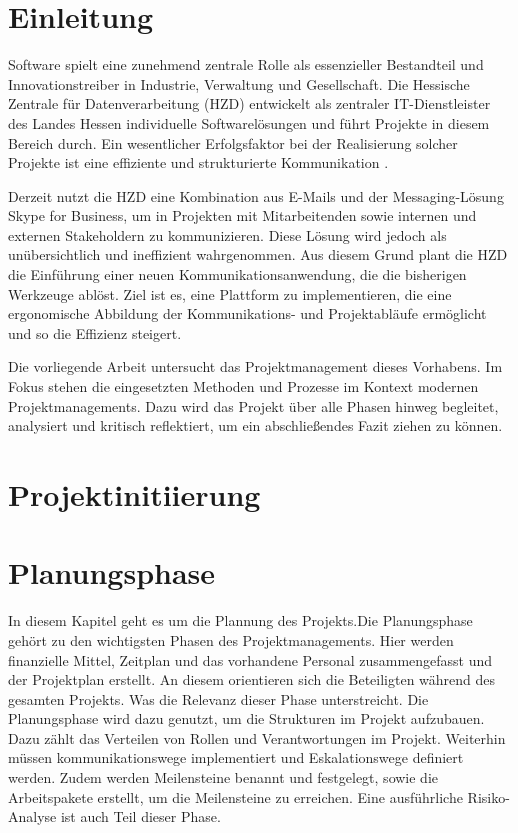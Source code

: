 \documentclass[12pt,oneside]{article}
\begin{document}
\cleardoublepage
{}
    \setcounter{page}{1}
\lhead{\nouppercase{\leftmark}}

\section{Einleitung}
Software spielt eine zunehmend zentrale Rolle als essenzieller Bestandteil und Innovationstreiber in Industrie, Verwaltung und Gesellschaft. Die Hessische Zentrale für Datenverarbeitung (HZD) entwickelt als zentraler IT-Dienstleister des Landes Hessen individuelle Softwarelösungen und führt Projekte in diesem Bereich durch. Ein wesentlicher Erfolgsfaktor bei der Realisierung solcher Projekte ist eine effiziente und strukturierte Kommunikation \cite{pikkarainen_impact_2008}. 

Derzeit nutzt die HZD eine Kombination aus E-Mails und der Messaging-Lösung Skype for Business, um in Projekten mit Mitarbeitenden sowie internen und externen Stakeholdern zu kommunizieren. Diese Lösung wird jedoch als unübersichtlich und ineffizient wahrgenommen. Aus diesem Grund plant die HZD die Einführung einer neuen Kommunikationsanwendung, die die bisherigen Werkzeuge ablöst. Ziel ist es, eine Plattform zu implementieren, die eine ergonomische Abbildung der Kommunikations- und Projektabläufe ermöglicht und so die Effizienz steigert.

Die vorliegende Arbeit untersucht das Projektmanagement dieses Vorhabens. Im Fokus stehen die eingesetzten Methoden und Prozesse im Kontext modernen Projektmanagements. Dazu wird das Projekt über alle Phasen hinweg begleitet, analysiert und kritisch reflektiert, um ein abschließendes Fazit ziehen zu können.


\section{Projektinitiierung}


\section{Planungsphase}
In diesem Kapitel geht es um die Plannung des Projekts.Die Planungsphase gehört zu den wichtigsten Phasen des Projektmanagements. Hier werden finanzielle Mittel, Zeitplan und das vorhandene Personal zusammengefasst und der Projektplan erstellt. An diesem orientieren sich die Beteiligten während des gesamten Projekts. Was die Relevanz dieser Phase unterstreicht. Die Planungsphase wird dazu genutzt, um die Strukturen im Projekt aufzubauen. Dazu zählt das Verteilen von Rollen und Verantwortungen im Projekt. Weiterhin müssen kommunikationswege implementiert und Eskalationswege definiert werden. 
Zudem werden Meilensteine benannt und festgelegt, sowie die Arbeitspakete erstellt, um die Meilensteine zu erreichen. Eine ausführliche Risiko-Analyse ist auch Teil dieser Phase. 
\end{document}
